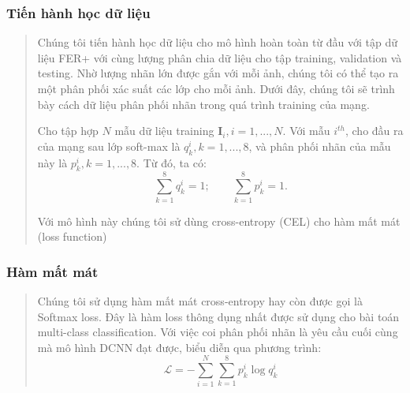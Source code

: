 \documentclass{article}
\begin{document}
\subsubsection{Tiến hành học dữ liệu}
\begin{quote}
   Chúng tôi tiến hành học dữ liệu cho mô hình hoàn toàn từ đầu với tập dữ liệu FER+ với cùng lượng phân chia dữ liệu cho tập training, validation và testing. Nhờ lượng nhãn lớn được gắn với mỗi ảnh, chúng tôi có thể tạo ra một phân phối xác suất các lớp cho mỗi ảnh. Dưới đây, chúng tôi sẽ trình bày cách dữ liệu phân phối nhãn trong quá trình training của mạng. 

   Cho tập hợp $N$ mẫu dữ liệu training \mbox{$\mathbf{I}_i, i = 1,...,N$}. Với mẫu $i^{th}$, cho đầu ra của mạng sau lớp soft-max là $q_k^i, k = 1,...,8$, và phân phối nhãn của mẫu này là $p_k^i, k = 1,...,8$. Từ đó, ta có: \[ \sum_{k=1}^{8} q_k^i = 1; \qquad \sum_{k=1}^{8} p_k^i = 1. \]

   Với mô hình này chúng tôi sử dùng cross-entropy (CEL) cho hàm mất mát (loss function)
\end{quote}
\subsubsection{Hàm mất mát}
\begin{quote}
   Chúng tôi sử dụng hàm mất mát cross-entropy hay còn được gọi là Softmax loss. Đây là hàm loss thông dụng nhất được sử dụng cho bài toán multi-class classification. Với việc coi phân phối nhãn là yêu cầu cuối cùng mà mô hình DCNN đạt được, biểu diễn qua phương trình:
   \[ \mathcal{L} = - \sum_{i=1}^{N} \sum_{k=1}^{8} p_k^i \log q_k^i\]
\end{quote}
\end{document}
